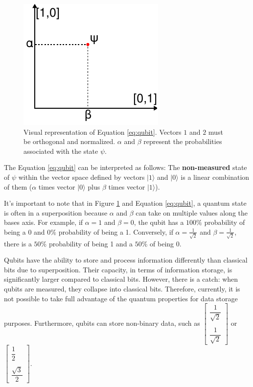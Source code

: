 		\begin{figure}[h]
			\centering
			\includegraphics{images/qubitPlot}
			\caption{Visual representation of Equation \ref{eq:qubit}. Vectors $1$ and $2$ must be orthogonal and normalized. $\alpha$ and $\beta$ represent the probabilities associated with the state $\psi$.}
			\label{fig:qubitplot}
		\end{figure}
		
		\par The Equation \ref{eq:qubit} can be interpreted as follows: The \textbf{non-measured} state of $\psi$ within the vector space defined by vectors $| 1 \rangle$ and $| 0 \rangle$ is a linear combination of them  ($\alpha$ times vector $| 0 \rangle$ plus $\beta$ times vector $| 1 \rangle$).\newline
		
		\par It's important to note that in Figure \ref{fig:qubitplot} and Equation \ref{eq:qubit}, a quantum state is often in a superposition because $\alpha$ and $\beta$ can take on multiple values along the bases axis. For example, if $\alpha = 1$ and $\beta = 0$, the qubit has a $100\%$ probability of being a 0 and $0\%$ probability of being a 1. Conversely, if $\alpha = \frac{1}{\sqrt{2}}$ and $\beta = \frac{1}{\sqrt{2}}$, there is a $50\%$ probability of being 1 and a $50\%$ of being 0.
		\newline  

		\par Qubits have the ability to store and process information differently than classical bits due to superposition. Their capacity, in terms of information storage, is significantly larger compared to classical bits. However, there is a catch: when qubits are measured, they collapse into classical bits. Therefore, currently, it is not possible to take full advantage of the quantum properties for data storage purposes. Furthermore, qubits can store non-binary data, such as $\begin{bmatrix} \dfrac{1}{\sqrt{2}} \\\\ \dfrac{1}{\sqrt{2}} \end{bmatrix}$ or $\begin{bmatrix} \dfrac{1}{2} \\\\ \dfrac{\sqrt{3}}{2} \end{bmatrix}$.\newline
		
